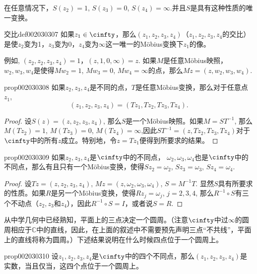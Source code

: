 在任意情况下，$S(z_2) = 1$, $S(z_3) = 0$, $S(z_4) = \infty$.并且$S$是具有这种性质的唯一变换。
\begin{definition}{交比}{def002030307}
如果$z_1 \in \cinfty$，那么$(z_1,z_2,z_3,z_4)$（$z_1,z_2,z_3,z_4$的交比）是使$z_2$变为1，$z_3$变为0，$z_4$变为$\infty$这一唯一的M\"obius变换下$z_1$的像。
\end{definition}

例如, $(z_2,z_2, z_3, z_4)=1$，$(z, 1, 0, \infty)=z$. 如果$M$是任意M\"obius映照，$w_2,w_3,w_4$是使得$Mw_2=1$, $Mw_3=0$, $Mw_4=\infty$的点，那么$Mz=(z,w_2,w_3,w_4)$.

\begin{proposition}{}{prop002030308}
如果$z_2,z_3,z_4$是不同的点，$T$是任意M\"obius变换，那么对于任意点$z_1$,
\[
(z_1,z_2,z_3,z_4) = (Tz_1, Tz_2, Tz_3, Tz_4).
\]
\end{proposition}

\begin{proof}
设$S(z) = (z, z_2, z_3, z_4)$, 那么$S$是一个M\"obius映照。如果$M = ST^{-1}$, 那么$M(Tz_2) = 1$, $M(Tz_3) = 0$, $M(Tz_4) = \infty$,因此$ST^{-1} = (z, Tz_2, Tz_3, Tz_4)$对于$\cinfty$中的所有$z$成立。特别地，令$z = Tz_1$便得到所要求的结果。
\end{proof}

\begin{proposition}{}{prop002030309}
如果$z_2, z_3, z_4$是$\cinfty$中的不同点， $\omega_2, \omega_3, \omega_4$也是$\cinfty$中的不同点，那么有且只有一个M\"obius变换，使得$Sz_2=\omega_2$, $Sz_3 = \omega_3$, $Sz_4 = \omega_4$.
\end{proposition}

\begin{proof}
设$Tz = (z, z_2, z_3, z_4)$, $Mz = (z, \omega_2, \omega_3, \omega_4)$, $S = M^{-1}T$. 显然$S$具有所要求的性质。如果$R$是另一个M\"obius变换，使得$Rz_j=\omega_j$, $j=2,3,4$, 那么$R^{-1}\circ S$有三个不动点（$z_2, z_3$和$z_4$），因此$R^{-1} \circ S = I$，或者说$S = R$.
\end{proof}

从中学几何中已经熟知，平面上的三点决定一个圆周。（注意$\cinfty$中过$\infty$的圆周相应于$\mathbb{C}$中的直线，因此，在上面的叙述中不需要预先声明三点“不共线”，平面上的直线将称为圆周。）下述结果说明在什么时候四点位于一个圆周上。

\begin{proposition}{}{prop002030310}
设$z_1,z_2,z_3,z_4$是$\cinfty$中的四个不同点，那么$(z_1,z_2,z_3,z_4)$是实数，当且仅当，这四个点位于一个圆周上。
\end{proposition}



